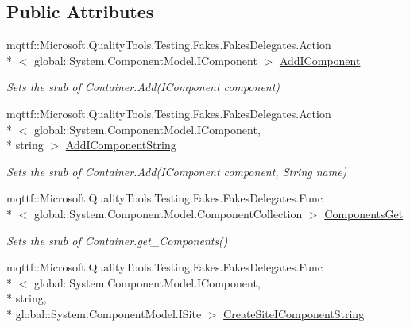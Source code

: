 \subsection*{Public Attributes}
\begin{DoxyCompactItemize}
\item 
mqttf\-::\-Microsoft.\-Quality\-Tools.\-Testing.\-Fakes.\-Fakes\-Delegates.\-Action\\*
$<$ global\-::\-System.\-Component\-Model.\-I\-Component $>$ \hyperlink{class_system_1_1_component_model_1_1_fakes_1_1_stub_container_a74da74e37c7b42231abe4fbb2668ccfd}{Add\-I\-Component}
\begin{DoxyCompactList}\small\item\em Sets the stub of Container.\-Add(\-I\-Component component)\end{DoxyCompactList}\item 
mqttf\-::\-Microsoft.\-Quality\-Tools.\-Testing.\-Fakes.\-Fakes\-Delegates.\-Action\\*
$<$ global\-::\-System.\-Component\-Model.\-I\-Component, \\*
string $>$ \hyperlink{class_system_1_1_component_model_1_1_fakes_1_1_stub_container_adbf5a2b9e27d72520b9c5940fd59ca5a}{Add\-I\-Component\-String}
\begin{DoxyCompactList}\small\item\em Sets the stub of Container.\-Add(\-I\-Component component, String name)\end{DoxyCompactList}\item 
mqttf\-::\-Microsoft.\-Quality\-Tools.\-Testing.\-Fakes.\-Fakes\-Delegates.\-Func\\*
$<$ global\-::\-System.\-Component\-Model.\-Component\-Collection $>$ \hyperlink{class_system_1_1_component_model_1_1_fakes_1_1_stub_container_a57422c70345443944fc5d398ac3fb13b}{Components\-Get}
\begin{DoxyCompactList}\small\item\em Sets the stub of Container.\-get\-\_\-\-Components()\end{DoxyCompactList}\item 
mqttf\-::\-Microsoft.\-Quality\-Tools.\-Testing.\-Fakes.\-Fakes\-Delegates.\-Func\\*
$<$ global\-::\-System.\-Component\-Model.\-I\-Component, \\*
string, \\*
global\-::\-System.\-Component\-Model.\-I\-Site $>$ \hyperlink{class_system_1_1_component_model_1_1_fakes_1_1_stub_container_a83e07b0b9317e9dad1db57db4666e9e5}{Create\-Site\-I\-Component\-String}

\end{DoxyCompactItemize}
